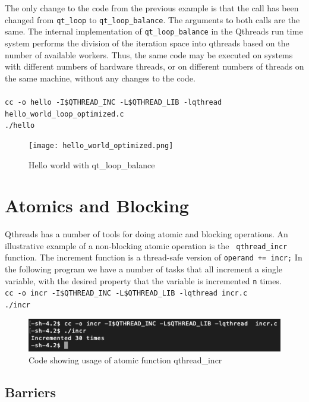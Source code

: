 \documentclass[12pt,fullpage]{article}
\begin{document}
The only change to the code from the previous example is that the call has been changed from {\tt qt\_loop} to {\tt qt\_loop\_balance}.  The arguments to both calls are the same.  The internal implementation of {\tt qt\_loop\_balance} in the Qthreads run time system performs the division of the iteration space into qthreads based on the number of available workers.  Thus, the same code may be executed on systems with different numbers of hardware threads, or on different numbers of threads on the same machine, without any changes to the code.
\\ \\
{\footnotesize{\tt cc -o hello -I\$QTHREAD\_INC -L\$QTHREAD\_LIB -lqthread hello\_world\_loop\_optimized.c}}
\\
{\footnotesize{\tt ./hello}}
\begin{figure}[h]
\texttt{[image: hello\_world\_optimized.png]}
\caption{Hello world with qt\_loop\_balance}
\end{figure}

\section{Atomics and Blocking}

Qthreads has a number of tools for doing atomic and blocking operations. An
illustrative example of a non-blocking atomic operation is the {\tt
qthread\_incr} function. The increment function is a thread-safe version of
{\tt *operand += incr;}
In the following program we have a number of tasks that all increment a single
variable, with the desired property that the variable is incremented {\tt n}
times.
\\

{\footnotesize{\tt cc -o incr -I\$QTHREAD\_INC -L\$QTHREAD\_LIB -lqthread incr.c}}
\\
{\footnotesize{\tt ./incr}}
\begin{figure}[h]
\includegraphics[scale=0.85]{incr.png}
\caption{Code showing usage of atomic function qthread\_incr}
\end{figure}

\subsection{Barriers}
\end{document}
